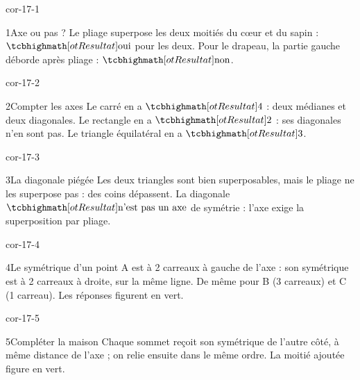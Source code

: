 \clearpage\pagestyle{otMain}\setlength{\otBlocEspacement}{2.5mm}\fontsize{11}{15}\selectfont{}
\begin{blocLivre}{cor-17-1}\begin{corrige}{1}{Axe ou pas ?}
Le pliage superpose les deux moitiés du cœur et du sapin : $\res{\text{oui}}$ pour les deux. Pour le drapeau, la partie gauche déborde après pliage : $\res{\text{non}}$.
\label{fig-cor-17-1}
\end{corrige}\end{blocLivre}
\begin{blocLivre}{cor-17-2}\begin{corrige}{2}{Compter les axes}
Le carré en a $\res4$ : deux médianes et deux diagonales. Le rectangle en a $\res2$ : ses diagonales n’en sont pas. Le triangle équilatéral en a $\res3$.
\label{fig-cor-17-2}
\end{corrige}\end{blocLivre}
\begin{blocLivre}{cor-17-3}\begin{corrige}{3}{La diagonale piégée}
Les deux triangles sont bien superposables, mais le pliage ne les superpose pas : des coins dépassent. La diagonale $\res{\text{n’est pas un axe}}$ de symétrie : l’axe exige la superposition par pliage.
\label{fig-cor-17-3}
\end{corrige}\end{blocLivre}
\begin{blocLivre}{cor-17-4}\begin{corrige}{4}{Le symétrique d’un point}
A est à 2 carreaux à gauche de l’axe : son symétrique est à 2 carreaux à droite, sur la même ligne. De même pour B (3 carreaux) et C (1 carreau). Les réponses figurent en vert.
\label{fig-cor-17-4}
\end{corrige}\end{blocLivre}
\begin{blocLivre}{cor-17-5}\begin{corrige}{5}{Compléter la maison}
Chaque sommet reçoit son symétrique de l’autre côté, à même distance de l’axe ; on relie ensuite dans le même ordre. La moitié ajoutée figure en vert.
\label{fig-cor-17-5}
\end{corrige}\end{blocLivre}
